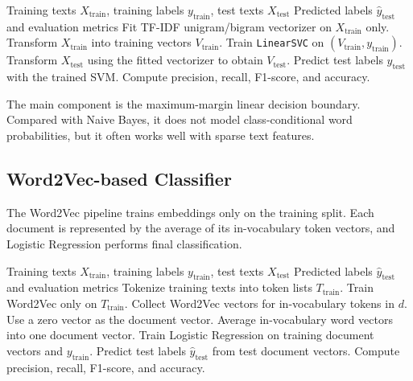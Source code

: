 \begin{algorithm}[H]
\caption{TF-IDF + Linear Support Vector Machine}
\label{alg:svm}
\begin{algorithmic}[1]
\Require Training texts $X_{\text{train}}$, training labels $y_{\text{train}}$, test texts $X_{\text{test}}$
\Ensure Predicted labels $\hat{y}_{\text{test}}$ and evaluation metrics
\State Fit TF-IDF unigram/bigram vectorizer on $X_{\text{train}}$ only.
\State Transform $X_{\text{train}}$ into training vectors $V_{\text{train}}$.
\State Train \texttt{LinearSVC} on $(V_{\text{train}}, y_{\text{train}})$.
\State Transform $X_{\text{test}}$ using the fitted vectorizer to obtain $V_{\text{test}}$.
\State Predict test labels $\hat{y}_{\text{test}}$ with the trained SVM.
\State Compute precision, recall, F1-score, and accuracy.
\end{algorithmic}
\end{algorithm}

The main component is the maximum-margin linear decision boundary. Compared with Naive Bayes, it does not model class-conditional word probabilities, but it often works well with sparse text features.

\subsection{Word2Vec-based Classifier}

The Word2Vec pipeline trains embeddings only on the training split. Each document is represented by the average of its in-vocabulary token vectors, and Logistic Regression performs final classification.

\begin{algorithm}[H]
\caption{Self-trained Word2Vec + Average Pooling + Logistic Regression}
\label{alg:word2vec}
\begin{algorithmic}[1]
\Require Training texts $X_{\text{train}}$, training labels $y_{\text{train}}$, test texts $X_{\text{test}}$
\Ensure Predicted labels $\hat{y}_{\text{test}}$ and evaluation metrics
\State Tokenize training texts into token lists $T_{\text{train}}$.
\State Train Word2Vec only on $T_{\text{train}}$.
    \State Collect Word2Vec vectors for in-vocabulary tokens in $d$.
        \State Use a zero vector as the document vector.
    \Else
        \State Average in-vocabulary word vectors into one document vector.
    \EndIf
\EndFor
\State Train Logistic Regression on training document vectors and $y_{\text{train}}$.
\State Predict test labels $\hat{y}_{\text{test}}$ from test document vectors.
\State Compute precision, recall, F1-score, and accuracy.
\end{algorithmic}
\end{algorithm}

